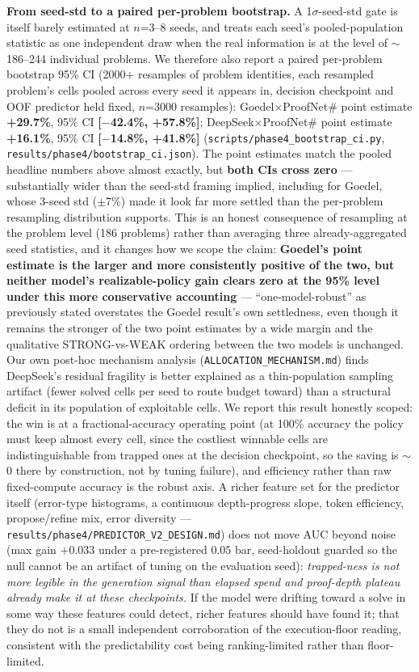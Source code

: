 \documentclass{article}
\begin{document}
\textbf{From seed-std to a paired per-problem bootstrap.} A 1$\sigma$-seed-std gate is itself
barely estimated at $n$=3--8 seeds, and treats each seed's pooled-population statistic as one
independent draw when the real information is at the level of $\sim$186--244 individual problems. We
therefore also report a paired per-problem bootstrap 95\% CI (2000+ resamples of problem identities,
each resampled problem's cells pooled across every seed it appears in, decision checkpoint and OOF
predictor held fixed, $n$=3000 resamples): Goedel$\times$ProofNet\# point estimate \textbf{+29.7\%},
95\% CI \textbf{[$-$42.4\%, +57.8\%]}; DeepSeek$\times$ProofNet\# point estimate \textbf{+16.1\%}, 95\%
CI \textbf{[$-$14.8\%, +41.8\%]} (\texttt{scripts/phase4\_bootstrap\_ci.py},
\texttt{results/phase4/bootstrap\_ci.json}). The point estimates match the pooled headline numbers
above almost exactly, but \textbf{both CIs cross zero} --- substantially wider than the seed-std
framing implied, including for Goedel, whose 3-seed std ($\pm$7\%) made it look far more settled than
the per-problem resampling distribution supports. This is an honest consequence of resampling at the
problem level (186 problems) rather than averaging three already-aggregated seed statistics, and it
changes how we scope the claim: \textbf{Goedel's point estimate is the larger and more consistently
positive of the two, but neither model's realizable-policy gain clears zero at the 95\% level under
this more conservative accounting} --- ``one-model-robust'' as previously stated overstates the
Goedel result's own settledness, even though it remains the stronger of the two point estimates by a
wide margin and the qualitative STRONG-vs-WEAK ordering between the two models is unchanged. Our own post-hoc mechanism analysis
(\texttt{ALLOCATION\_MECHANISM.md}) finds DeepSeek's residual fragility is better explained as a
thin-population sampling artifact (fewer solved cells per seed to route budget toward) than a structural
deficit in its population of exploitable cells. We report this result honestly scoped: the win is at a
fractional-accuracy operating point (at 100\% accuracy the policy must keep almost every cell, since the
costliest winnable cells are indistinguishable from trapped ones at the decision checkpoint, so the
saving is $\sim$0 there by construction, not by tuning failure), and efficiency rather than raw
fixed-compute accuracy is the robust axis. A richer feature set for the predictor itself (error-type
histograms, a continuous depth-progress slope, token efficiency, propose/refine mix, error diversity
--- \texttt{results/phase4/PREDICTOR\_V2\_DESIGN.md}) does not move AUC beyond noise (max gain
$+0.033$ under a pre-registered $0.05$ bar, seed-holdout guarded so the null cannot be an artifact of
tuning on the evaluation seed): \emph{trapped-ness is not more legible in the generation signal than
elapsed spend and proof-depth plateau already make it at these checkpoints.} If the model were drifting
toward a solve in some way these features could detect, richer features should have found it; that
they do not is a small independent corroboration of the execution-floor reading, consistent with the
predictability cost being ranking-limited rather than floor-limited.
\end{document}
